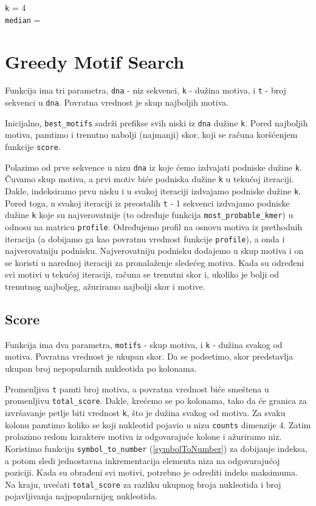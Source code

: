 \noindent \texttt{k} = 4
\\\texttt{median} =


\section{Greedy Motif Search}

Funkcija ima tri parametra, \texttt{dna} - niz sekvenci, \texttt{k} - dužina motiva, i \texttt{t} - broj sekvenci u \texttt{dna}. Povratna vrednost je skup najboljih motiva.

Inicijalno, \texttt{best\_motifs} sadrži prefikse svih niski iz \texttt{dna} dužine \texttt{k}. Pored najboljih motiva, pamtimo i trenutno nabolji (najmanji) skor, koji se računa koršćenjem funkcije \texttt{score}. 

Polazimo od prve sekvence u nizu \texttt{dna} iz koje ćemo izdvajati podniske dužine \texttt{k}. Čuvamo skup motiva, a prvi motiv biće podniska dužine \texttt{k} u tekućoj iteraciji. Dakle, indeksiramo prvu nisku i u svakoj iteraciji izdvajamo podniske dužine \texttt{k}. Pored toga, u svakoj iteraciji iz preostalih \texttt{t} - 1 sekvenci izdvajamo podniske dužine \texttt{k} koje su najverovatnije (to određuje funkcija \texttt{most\_probable\_kmer}) u odnosu na matricu \texttt{profile}. Određujemo profil na osnovu motiva iz prethodnih iteracija (a dobijamo ga kao povratnu vrednost funkcije \texttt{profile}), a onda i najverovatniju podnisku. Najverovatniju podnisku dodajemo u skup motiva i on se koristi u narednoj iteraciji za pronalaženje sledećeg motiva. Kada su određeni svi motivi u tekućoj iteraciji, računa se trenutni skor i, ukoliko je bolji od trenutnog najboljeg, ažuriramo najbolji skor i motive.





\subsection{Score}
\label{score}

Funkcija ima dva parametra, \texttt{motifs} - skup motiva, i \texttt{k} - dužina svakog od motiva. Povratna vrednost je ukupan skor. Da se podsetimo, skor predstavlja ukupan broj nepopularnih nukleotida po kolonama.

Promenljiva \texttt{t} pamti broj motiva, a povratna vrednost biće smeštena u promenljivu \texttt{total\_score}. Dakle, krećemo se po kolonama, tako da će granica za izvršavanje petlje biti vrednost \texttt{k}, što je dužina svakog od motiva. Za svaku kolonu pamtimo koliko se koji nukleotid pojavio u nizu \texttt{counts} dimenzije 4. Zatim prolazimo redom karaktere motiva iz odgovarajuće kolone i ažuriramo niz. Koristimo funkciju \texttt{symbol\_to\_number} (\ref{symbolToNumber}) za dobijanje indeksa, a potom sledi jednostavna inkrementacija elementa niza na odgovarajućoj poziciji. Kada su obrađeni svi motivi, potrebno je odrediti indeks maksimuma. Na kraju, uvećati \texttt{total\_score} za razliku ukupnog broja nukleotida i broj pojavljivanja najpopularnijeg nukleotida.

